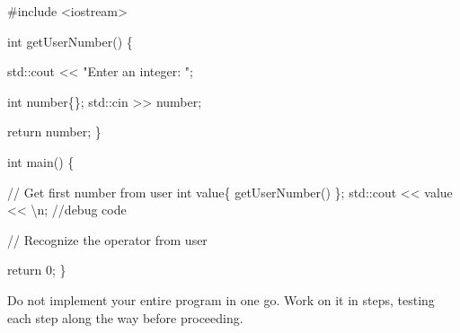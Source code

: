 \documentclass[
  letterpaper,
  DIV=11,
  numbers=noendperiod]{scrreprt}
\newenvironment{Shaded}{\begin{snugshade}}{\end{snugshade}}
\newcommand{\CommentTok}[1]{\textcolor[rgb]{0.37,0.37,0.37}{#1}}
\newcommand{\DecValTok}[1]{\textcolor[rgb]{0.68,0.00,0.00}{#1}}
\newcommand{\ErrorTok}[1]{\textcolor[rgb]{0.68,0.00,0.00}{#1}}
\newcommand{\FunctionTok}[1]{\textcolor[rgb]{0.28,0.35,0.67}{#1}}
\newcommand{\NormalTok}[1]{\textcolor[rgb]{0.00,0.23,0.31}{#1}}
\newcommand{\SpecialCharTok}[1]{\textcolor[rgb]{0.37,0.37,0.37}{#1}}
\newcommand{\StringTok}[1]{\textcolor[rgb]{0.13,0.47,0.30}{#1}}
\begin{document}
\begin{Shaded}
\begin{Highlighting}[]
\CommentTok{\#include \textless{}iostream\textgreater{}}

\NormalTok{int }\FunctionTok{getUserNumber}\NormalTok{() \{}

\NormalTok{    std}\SpecialCharTok{::}\NormalTok{cout }\SpecialCharTok{\textless{}}\ErrorTok{\textless{}} \StringTok{"Enter an integer: "}\NormalTok{;}
    
\NormalTok{    int number\{\};}
\NormalTok{    std}\SpecialCharTok{::}\NormalTok{cin }\SpecialCharTok{\textgreater{}}\ErrorTok{\textgreater{}}\NormalTok{ number;}

\NormalTok{    return number;}
\NormalTok{\}}

\NormalTok{int }\FunctionTok{main}\NormalTok{() \{}

    \SpecialCharTok{/}\ErrorTok{/}\NormalTok{ Get first number from user}
\NormalTok{    int value\{ }\FunctionTok{getUserNumber}\NormalTok{() \};}
\NormalTok{    std}\SpecialCharTok{::}\NormalTok{cout }\SpecialCharTok{\textless{}}\ErrorTok{\textless{}}\NormalTok{ value }\SpecialCharTok{\textless{}}\ErrorTok{\textless{}} \StringTok{\textquotesingle{}}\SpecialCharTok{\textbackslash{}n}\StringTok{\textquotesingle{}}\NormalTok{;     }\SpecialCharTok{/}\ErrorTok{/}\NormalTok{debug code}

    \SpecialCharTok{/}\ErrorTok{/}\NormalTok{ Recognize the operator from user}

\NormalTok{    return }\DecValTok{0}\NormalTok{;}
\NormalTok{\}}
\end{Highlighting}
\end{Shaded}

\begin{tcolorbox}[enhanced jigsaw, toprule=.15mm, rightrule=.15mm, opacityback=0, breakable, leftrule=.75mm, colback=white, colframe=quarto-callout-warning-color-frame, arc=.35mm, left=2mm, bottomrule=.15mm]
\begin{minipage}[t]{5.5mm}
\textcolor{quarto-callout-warning-color}{\faExclamationTriangle}
\end{minipage}%
\begin{minipage}[t]{\textwidth - 5.5mm}

Do not implement your entire program in one go. Work on it in steps,
testing each step along the way before proceeding.

\end{minipage}%
\end{tcolorbox}
\end{document}
